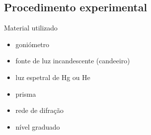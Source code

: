 \documentclass[a4paper,12pt]{article}      %
\begin{document}
\subsection{\sf Procedimento experimental}
	

Material utilizado

\begin{itemize}
\item goniómetro
\item fonte de luz incandescente (candeeiro)
\item luz espetral de Hg ou He
\item prisma
\item rede de difração
\item nível graduado
\end{itemize}
\end{document}
